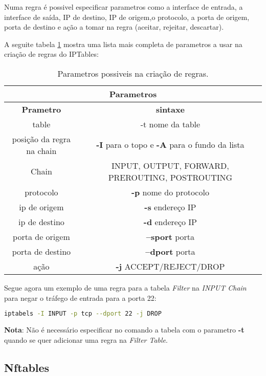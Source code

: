 Numa regra é possivel especificar parametros como a interface de entrada, 
a interface de saída, IP de destino, IP de origem,o protocolo, a porta de 
origem, porta de destino e ação a tomar na regra (aceitar, rejeitar, descartar).

A seguite tabela \ref{ipt3args} mostra uma lista mais completa de parametros a usar na
criação de regras do IPTables:

\begin{table}[H]
\centering
\begin{tabular}{|c|c|}
\hline
\multicolumn{2}{|c|}{Parametros}\\
\hline
\textbf{Prametro} & \textbf{sintaxe} \\
\hline
table & -t nome da table \\
\hline
posição da regra na chain & \textbf{-I} para o topo e \textbf{-A} para o fundo da lista \\
\hline
Chain & INPUT, OUTPUT, FORWARD, PREROUTING, POSTROUTING \\
\hline
protocolo & \textbf{-p} nome do protocolo  \\
\hline
ip de origem & \textbf{-s} endereço IP  \\
\hline
ip de destino & \textbf{-d} endereço IP  \\
\hline
porta de origem & \textbf{--sport} porta  \\
\hline
porta de destino & \textbf{--dport} porta  \\
\hline
ação & \textbf{-j} ACCEPT/REJECT/DROP  \\
\hline
\end{tabular}
\caption{Parametros possiveis na criação de regras.}
\label{ipt3args}
\end{table}
    
Segue agora um exemplo de uma regra para a tabela \textit{Filter} na 
\textit{INPUT Chain} para negar o tráfego de entrada para a porta 22:

\begin{lstlisting}[language=Bash, caption={exemplo de comando}]
iptabels -I INPUT -p tcp --dport 22 -j DROP
\end{lstlisting}

\textbf{Nota}: Não é necessário especificar no comando a tabela  com o parametro
\textbf{-t} quando se quer adicionar uma regra na \textit{Filter Table}.

\subsection{Nftables}

